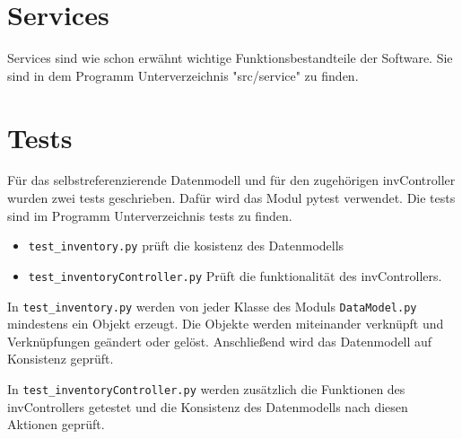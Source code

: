 \section*{Services}
Services sind wie schon erwähnt wichtige Funktionsbestandteile der Software. Sie sind in dem Programm Unterverzeichnis "src/service" zu finden.

\section*{Tests}
Für das selbstreferenzierende Datenmodell und für den zugehörigen \glqq invController \grqq  wurden zwei tests geschrieben. 
Dafür wird das Modul \glqq pytest \grqq verwendet. Die tests sind im Programm Unterverzeichnis \glqq tests \grqq zu finden. 
\begin{itemize}
    \item \verb|test_inventory.py| prüft die kosistenz des Datenmodells
    \item \verb|test_inventoryController.py| Prüft die funktionalität des invControllers.
\end{itemize} 
In \verb|test_inventory.py| werden von jeder Klasse des Moduls \verb|DataModel.py| mindestens ein Objekt erzeugt. 
Die Objekte werden miteinander verknüpft und Verknüpfungen geändert oder gelöst. Anschließend wird das Datenmodell auf Konsistenz geprüft. 

In \verb|test_inventoryController.py| werden zusätzlich die Funktionen des invControllers getestet und die Konsistenz des
Datenmodells nach diesen Aktionen geprüft. 
